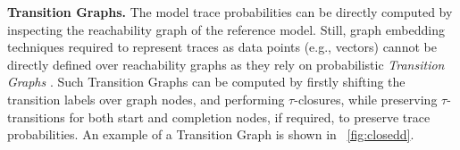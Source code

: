 \medskip
\noindent
\textbf{Transition Graphs.} The model trace probabilities can be directly computed by inspecting the reachability graph of the reference model. Still, graph embedding techniques required to represent traces as data points (e.g., vectors)
cannot be directly defined over reachability graphs as they %
rely on probabilistic \emph{Transition Graphs} \cite{GartnerFW03}. Such Transition Graphs can be computed by firstly shifting the transition labels over graph nodes, and performing $\tau$-closures, while preserving $\tau$-transitions for both start and completion nodes, if required, to preserve trace probabilities. An example of a Transition Graph is shown in \figurename~\ref{fig:closedd}.


